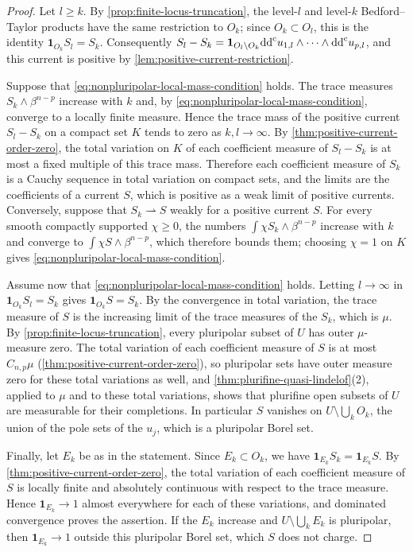 \begin{proof}
Let $l\geq k$. By \cref{prop:finite-locus-truncation}, the level-$l$ and level-$k$ Bedford--Taylor products have the same restriction to $O_k$; since $O_k\subset O_l$, this is the identity $\mathbf1_{O_k}S_l=S_k$. Consequently $S_l-S_k=\mathbf1_{O_l\setminus O_k}\mathrm{dd}^{\mathrm{c}} u_{1,l}\wedge\cdots\wedge\mathrm{dd}^{\mathrm{c}} u_{p,l}$, and this current is positive by \cref{lem:positive-current-restriction}.

Suppose that \eqref{eq:nonpluripolar-local-mass-condition} holds. The trace measures $S_k\wedge\beta^{n-p}$ increase with $k$ and, by \eqref{eq:nonpluripolar-local-mass-condition}, converge to a locally finite measure. Hence the trace mass of the positive current $S_l-S_k$ on a compact set $K$ tends to zero as $k,l\to\infty$. By \cref{thm:positive-current-order-zero}, the total variation on $K$ of each coefficient measure of $S_l-S_k$ is at most a fixed multiple of this trace mass. Therefore each coefficient measure of $S_k$ is a Cauchy sequence in total variation on compact sets, and the limits are the coefficients of a current $S$, which is positive as a weak limit of positive currents. Conversely, suppose that $S_k\rightharpoonup S$ weakly for a positive current $S$. For every smooth compactly supported $\chi\geq0$, the numbers $\int\chi S_k\wedge\beta^{n-p}$ increase with $k$ and converge to $\int\chi S\wedge\beta^{n-p}$, which therefore bounds them; choosing $\chi=1$ on $K$ gives \eqref{eq:nonpluripolar-local-mass-condition}.

Assume now that \eqref{eq:nonpluripolar-local-mass-condition} holds. Letting $l\to\infty$ in $\mathbf1_{O_k}S_l=S_k$ gives $\mathbf1_{O_k}S=S_k$. By the convergence in total variation, the trace measure of $S$ is the increasing limit of the trace measures of the $S_k$, which is $\mu$. By \cref{prop:finite-locus-truncation}, every pluripolar subset of $U$ has outer $\mu$-measure zero. The total variation of each coefficient measure of $S$ is at most $C_{n,p}\mu$ (\cref{thm:positive-current-order-zero}), so pluripolar sets have outer measure zero for these total variations as well, and \cref{thm:plurifine-quasi-lindelof}(2), applied to $\mu$ and to these total variations, shows that plurifine open subsets of $U$ are measurable for their completions. In particular $S$ vanishes on $U\setminus\bigcup_kO_k$, the union of the pole sets of the $u_j$, which is a pluripolar Borel set.

Finally, let $E_k$ be as in the statement. Since $E_k\subset O_k$, we have $\mathbf1_{E_k}S_k=\mathbf1_{E_k}S$. By \cref{thm:positive-current-order-zero}, the total variation of each coefficient measure of $S$ is locally finite and absolutely continuous with respect to the trace measure. Hence $\mathbf1_{E_k}\to1$ almost everywhere for each of these variations, and dominated convergence proves the assertion. If the $E_k$ increase and $U\setminus\bigcup_kE_k$ is pluripolar, then $\mathbf1_{E_k}\to1$ outside this pluripolar Borel set, which $S$ does not charge.
\end{proof}

